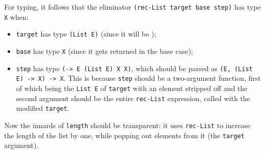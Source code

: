 For typing, it follows that the eliminator \texttt{(rec-List target base step)}
has type \texttt{X} when:
\begin{itemize}
\item \texttt{target} has type \texttt{(List E)} (since it will be );
\item \texttt{base} has type \texttt{X} (since it gets returned in the base case);
\item \texttt{step} has type \texttt{(-> E (List E) X X)}, which should be
  parsed as \texttt{(E, (List E) -> X) -> X}. This is because \texttt{step} should
  be a two-argument function, first of which being the \texttt{List E} of \texttt{target}
  with an element stripped off and the second argument should be the entire
  \texttt{rec-List} expression, called with the modified \texttt{target}.
\end{itemize}

Now the innards of \texttt{length} should be transparent: it uses \texttt{rec-List}
to increase the length of the list by one, while popping out elements
from it (the \texttt{target} argument).


